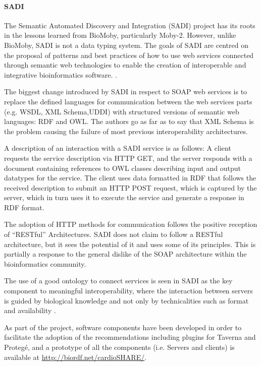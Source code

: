\paragraph{SADI}
The Semantic Automated Discovery and Integration (SADI) project has its roots in the lessons learned from BioMoby, particularly  Moby-2. However, unlike BioMoby, SADI is not a data typing system. The goals of SADI are centred on the proposal of patterns and best practices of how to use web services connected through semantic web technologies to enable the creation of interoperable and integrative bioinformatics software. \cite{WIL2011}.

The biggest change introduced by SADI in respect to SOAP web services is to replace the defined languages for communication between the web services parts (e.g. WSDL, XML Schema,UDDI) with structured versions of semantic web languages: RDF and OWL. The authors go as far as to say that XML Schema is the problem causing the failure of most previous interoperability architectures.

A description of an interaction with a SADI service is as follows: A client requests the service description via HTTP GET, and the server responds with a document containing references to OWL classes describing input and output datatypes for the service. The client uses data formatted in RDF that follows the received description to submit an HTTP POST request, which is captured by the server, which in turn uses it to execute the service and generate a response in RDF format.

The adoption of HTTP methods for communication follows the positive reception of ``RESTful'' Architectures. SADI does not claim to follow a RESTful architecture, but it sees the potential of it and uses some of its principles. This is partially a response to the general dislike of the SOAP architecture within the bioinformatics community.

The use of a good ontology to connect services is seen in SADI as the key component to meaningful interoperability, where the interaction between servers is guided by biological knowledge and not only by technicalities such as format and availability \cite{WIL2011}.

As part of the project, software components have been developed in order to facilitate the adoption of the recommendations including plugins for Taverna and Protegé, and a  prototype of all the components (i.e. Servers and clients) is available at \url{http://biordf.net/cardioSHARE/}.


